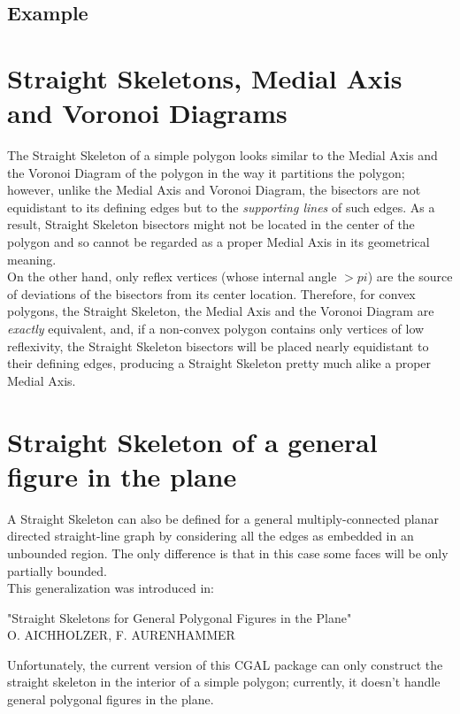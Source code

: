 \subsection{Example}


\section{Straight Skeletons, Medial Axis and Voronoi Diagrams}  

The Straight Skeleton of a simple polygon looks similar to the Medial Axis and the Voronoi Diagram of the polygon in the way it partitions the polygon; however, unlike the Medial Axis and Voronoi Diagram, the
bisectors are not equidistant to its defining edges but to the \textit{supporting lines} of such edges. As a result, Straight Skeleton bisectors might not be located in the center of the polygon and so cannot be regarded as a proper Medial Axis in its geometrical meaning.\\
On the other hand, only reflex vertices (whose internal angle $>pi$) are the source of deviations of the bisectors from its center location. Therefore, for convex polygons, the Straight Skeleton, the Medial Axis
and the Voronoi Diagram are \textit{exactly} equivalent, and, if a non-convex 
polygon contains only vertices of low reflexivity, the Straight Skeleton bisectors will be placed nearly equidistant to their defining edges, producing a Straight Skeleton pretty much alike a proper Medial Axis.


\section{Straight Skeleton of a general figure in the plane}

A Straight Skeleton can also be defined for a general multiply-connected planar directed straight-line graph by considering all the edges as embedded in an unbounded region. The only difference is that in this case some faces will be only partially bounded.\\
This generalization was introduced in:

"Straight Skeletons for General Polygonal Figures in the Plane"\\
O. AICHHOLZER, F. AURENHAMMER

Unfortunately, the current version of this CGAL package can only construct the straight skeleton in the interior of a simple polygon; currently, it doesn't handle general polygonal figures in the plane.


